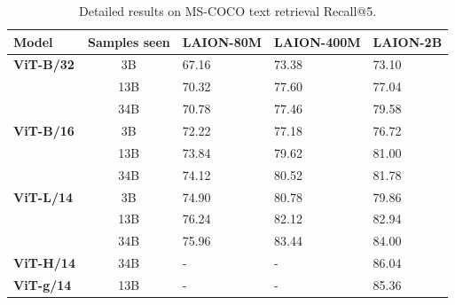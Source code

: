 \begin{appendix}
\begin{table}[tb]
\centering
\small
\begin{tabular}{@{}lclll@{}}
\toprule
\textbf{Model}                     & \textbf{Samples seen} & \textbf{LAION-80M} & \textbf{LAION-400M} & \textbf{LAION-2B} \\ \midrule
\textbf{ViT-B/32} & 3B           & 67.16     & 73.38      & 73.10       \\
                          & 13B          & 70.32     & 77.60       & 77.04       \\
                          & 34B          & 70.78         & 77.46      &79.58        \\ \midrule
\textbf{ViT-B/16} & 3B           & 72.22     & 77.18      & 76.72       \\
                          & 13B          & 73.84     & 79.62       & 81.00       \\
                          & 34B          & 74.12         & 80.52      & 81.78        \\ \midrule                          
\textbf{ViT-L/14} & 3B           & 74.90     & 80.78      & 79.86       \\         
& 13B          & 76.24         & 82.12      & 82.94           \\
                          & 34B          & 75.96         & 83.44       & 84.00       \\ \midrule 
\textbf{ViT-H/14} & 34B           & -     & -      & 86.04       \\         \midrule 
\textbf{ViT-g/14} & 13B           & -     & -      & 85.36       \\         \bottomrule 

\end{tabular}

\caption{Detailed results on MS-COCO text retrieval Recall@5. 
}
\label{table:zeroshot_mscoco_text_retrieval}
\end{table}


\begin{table}[tb]


\end{table}
\end{appendix}
